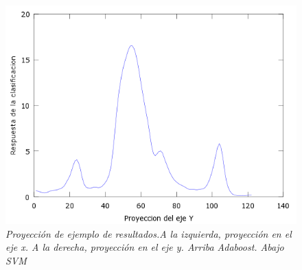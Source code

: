 \begin{figure}[htc]
  \includegraphics[scale=.4]{images/plots/svm8Y}
 \caption{\em  Proyección de ejemplo de resultados.A la izquierda, proyección en el eje x. A la derecha, proyección en el eje y. Arriba Adaboost. Abajo SVM}   
 \label{fig:pro8}
\end{figure}
